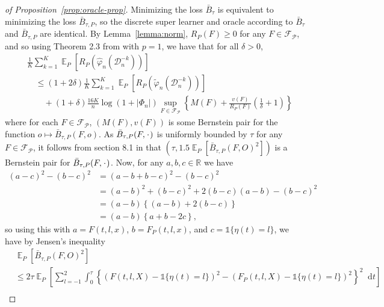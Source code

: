 \documentclass[alpha-refs]{wiley-article}
\DeclareMathOperator{\E}{\mathbb{E}} %
\newcommand{\R}{\mathbb{R}}
\newcommand{\blank}{\makebox[1ex]{\textbf{$\cdot$}}}
\renewcommand{\phi}{\varphi}
\newcommand*\diff{\mathop{}\!\mathrm{d}}
\newcommand{\1}{\mathds{1}}
\newcommand{\data}{\ensuremath{\mathcal{D}}}
\begin{document}
\begin{proof}[of Proposition~\ref{prop:oracle-prop}]
  Minimizing the loss \( \bar{B}_{\tau} \) is equivalent to
  minimizing the loss \( \bar{B}_{\tau,P} \), so the discrete super learner and
  oracle according to \( \bar{B}_{\tau} \) and \( \bar{B}_{\tau,P} \) are
  identical. By Lemma~\ref{lemma:norm}, \( R_P(F) \geq 0 \) for any
  \( F \in \mathcal{F}_{\mathcal{P}} \), and so using Theorem 2.3 from
  \citep{vaart2006oracle} with \( p=1 \), we have that for all \( \delta >0 \),
\begin{align*}
  & \frac{1}{K} \sum_{k=1}^{K} \E_{P}{\left[ R_P(\hat{\phi}_n(\data_n^{-k})) \right]}
  \\
  &  \quad \leq
    (1+2\delta)\frac{1}{K} \sum_{k=1}^{K}\E_{P}{\left[ R_P(\tilde{\phi}_n(\data_n^{-k})) \right]}
  \\
  & \qquad + (1+\delta) \frac{16 K}{n}
    \log(1 + |\Phi_n|)\sup_{F \in \mathcal{F}_{\mathcal{P}}}
    \left\{
    M(F) + \frac{v(F)}{R_P(F)}
    \left(
    \frac{1}{\delta} + 1
    \right)
    \right\}
\end{align*}
where for each \( F \in \mathcal{F}_{\mathcal{P}} \),
\( (M(F), v(F)) \) is some Bernstein pair for the function
\(o \mapsto \bar{B}_{\tau,P}(F, o) \). As
\( \bar{B}_{\tau,P}(F, \blank) \) is uniformly bounded by \( \tau \)
for any \( F \in \mathcal{F}_{\mathcal{P}} \), it follows from section
8.1 in \citep{vaart2006oracle} that
\( (\tau, 1.5 \E_P{[\bar{B}_{\tau,P}(F, O)^2]}) \) is a Bernstein
pair for \( \bar{B}_{\tau,P}(F, \blank) \). Now, for any
\( a,b,c \in \R \) we have
\begin{align*}
  (a-c)^2 - (b-c)^2
  & = (a-b+b-c)^2 - (b-c)^2
  \\
  & = (a-b)^2 + (b-c)^2 +2(b-c)(a-b) - (b-c)^2
  \\
  & = (a-b)
    \left\{
    (a-b) +  2(b-c)
    \right\}
  \\
  & = (a-b)
    \left\{
     a + b -2c
    \right\},
\end{align*}
so using this with \( a=F(t, l, x) \), \( b=F_P(t, l, x) \), and
\( c = \1{\{\eta(t) = l\}} \), we have by Jensen's inequality
\begin{align*}
  & \E_P{[\bar{B}_{\tau,P}(F, O)^2]}
  \\
  & \leq
    2\tau\E_{P}{\left[
    \sum_{l=-1}^{2} \int_0^{\tau}
    \left\{
    \left(
    F(t, l, X) - \1{\{\eta(t) = l\}}
    \right)^2
    -
    \left(
    F_P(t, l, X) - \1{\{\eta(t) = l\}}
    \right)^2
    \right\}^2
    \diff t 
    \right]}
  \\

\end{align*}
\end{proof}
\end{document}
